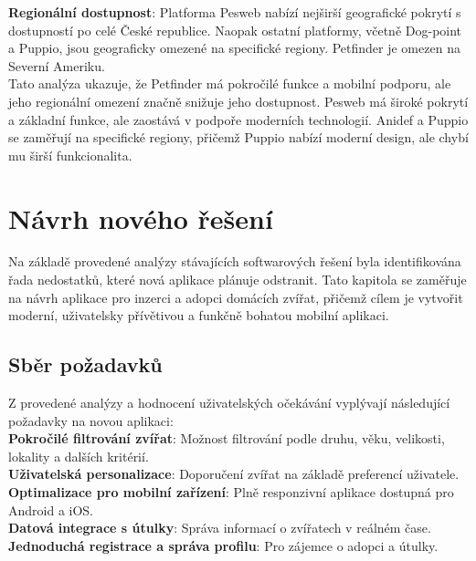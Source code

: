 \documentclass[czech, bp, kiv, he, iso690numb, pdf]{fasthesis}
\begin{document}
    \noindent \textbf{Regionální dostupnost}: Platforma Pesweb nabízí nejširší geografické pokrytí s dostupností po celé České republice. Naopak ostatní platformy, včetně Dog-point a Puppio, jsou geograficky omezené na specifické regiony. Petfinder je omezen na Severní Ameriku.\\

    Tato analýza ukazuje, že Petfinder má pokročilé funkce a mobilní podporu, ale jeho regionální omezení značně snižuje jeho dostupnost. Pesweb má široké pokrytí a základní funkce, ale zaostává v podpoře moderních technologií. Anidef a Puppio se zaměřují na specifické regiony, přičemž Puppio nabízí moderní design, ale chybí mu širší funkcionalita.\\


    \chapter{Návrh nového řešení}

    Na základě provedené analýzy stávajících softwarových řešení byla identifikována řada nedostatků, které nová aplikace plánuje odstranit. Tato kapitola se zaměřuje na návrh aplikace pro inzerci a adopci domácích zvířat, přičemž cílem je vytvořit moderní, uživatelsky přívětivou a funkčně bohatou mobilní aplikaci.

    \section{Sběr požadavků}

    Z provedené analýzy a hodnocení uživatelských očekávání vyplývají následující požadavky na novou aplikaci:\\

    \noindent \textbf{Pokročilé filtrování zvířat}: Možnost filtrování podle druhu, věku, velikosti, lokality a dalších kritérií.\\

    \noindent \textbf{Uživatelská personalizace}: Doporučení zvířat na základě preferencí uživatele.\\

    \noindent \textbf{Optimalizace pro mobilní zařízení}: Plně responzivní aplikace dostupná pro Android a iOS.\\

    \noindent \textbf{Datová integrace s útulky}: Správa informací o zvířatech v reálném čase.\\

    \noindent \textbf{Jednoduchá registrace a správa profilu}: Pro zájemce o adopci a útulky.\\
\end{document}
